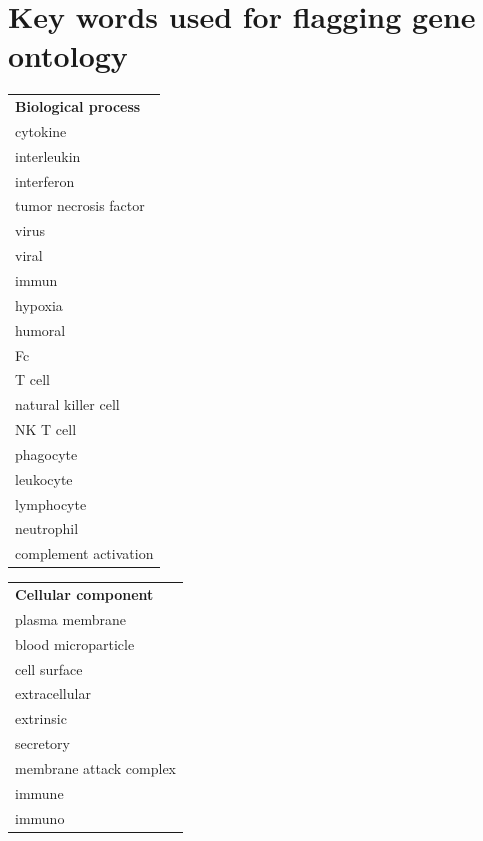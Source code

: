 \documentclass{article}
\begin{document}
\newpage
{}



\newpage
{}
\appendix
\section{Key words used for flagging gene ontology}\label{kw}
\begin{table}[H]
\Large
\begin{tabular}{l}
\textbf{Biological process} \\
cytokine \\
interleukin \\
interferon \\
tumor necrosis factor \\
virus \\
viral \\
immun \\
hypoxia \\
humoral \\
Fc \\
T cell \\
natural killer cell \\
NK T cell \\
phagocyte \\
leukocyte \\
lymphocyte \\
neutrophil \\
complement activation
\end{tabular}

\vspace{5mm}
\begin{tabular}{l}
\textbf{Cellular component} \\
plasma membrane \\
blood microparticle \\
cell surface \\
extracellular \\
extrinsic \\
secretory \\
membrane attack complex \\
immune \\
immuno
\end{tabular}
\end{table}

\newpage
\end{document}
